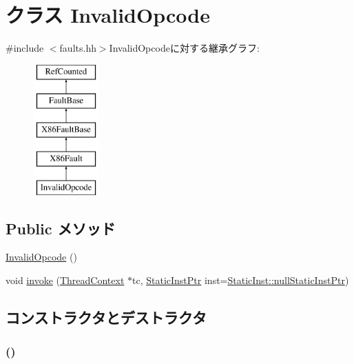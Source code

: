 \hypertarget{classX86ISA_1_1InvalidOpcode}{
\section{クラス InvalidOpcode}
\label{classX86ISA_1_1InvalidOpcode}
}


{\ttfamily \#include $<$faults.hh$>$}InvalidOpcodeに対する継承グラフ:\begin{figure}[H]
\begin{center}
\leavevmode
\includegraphics[height=5cm]{classX86ISA_1_1InvalidOpcode}
\end{center}
\end{figure}
\subsection*{Public メソッド}
\begin{DoxyCompactItemize}
\item 
\hyperlink{classX86ISA_1_1InvalidOpcode_a18165f1837a38bf8097d8937db354d42}{InvalidOpcode} ()
\item 
void \hyperlink{classX86ISA_1_1InvalidOpcode_a2bd783b42262278d41157d428e1f8d6f}{invoke} (\hyperlink{classThreadContext}{ThreadContext} $\ast$tc, \hyperlink{classRefCountingPtr}{StaticInstPtr} inst=\hyperlink{classStaticInst_aa793d9793af735f09096369fb17567b6}{StaticInst::nullStaticInstPtr})
\end{DoxyCompactItemize}


\subsection{コンストラクタとデストラクタ}
\hypertarget{classX86ISA_1_1InvalidOpcode_a18165f1837a38bf8097d8937db354d42}{
\subsubsection[{InvalidOpcode}]{ ()}}
\label{classX86ISA_1_1InvalidOpcode_a18165f1837a38bf8097d8937db354d42}



